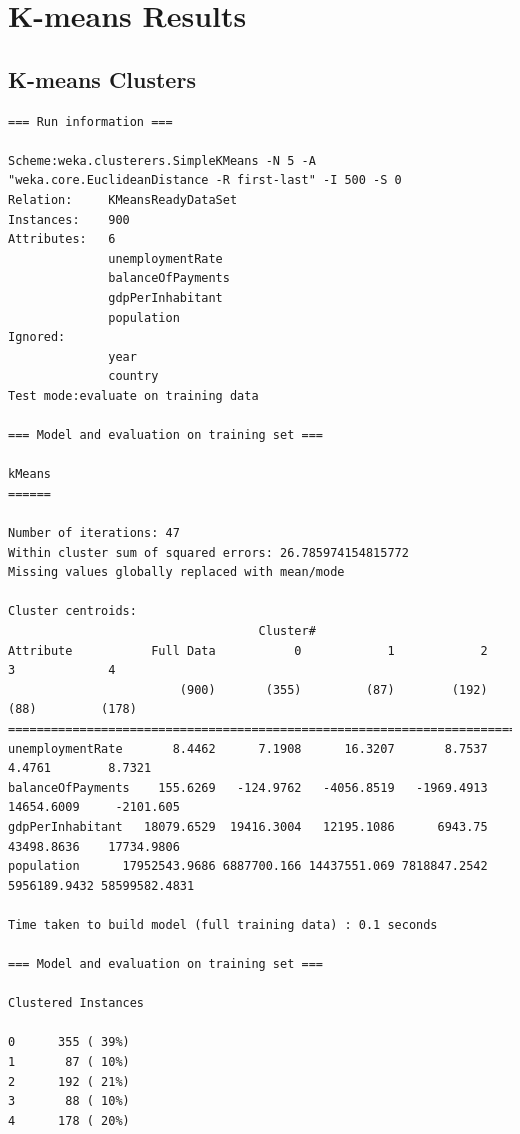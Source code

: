 \section{K-means Results}

\subsection{K-means Clusters}
\label{A_kmr_clusters}
\begin{lstlisting}[basicstyle=\footnotesize\ttfamily,numbers=none]
=== Run information ===

Scheme:weka.clusterers.SimpleKMeans -N 5 -A "weka.core.EuclideanDistance -R first-last" -I 500 -S 0
Relation:     KMeansReadyDataSet
Instances:    900
Attributes:   6
              unemploymentRate
              balanceOfPayments
              gdpPerInhabitant
              population
Ignored:
              year
              country
Test mode:evaluate on training data

=== Model and evaluation on training set ===

kMeans
======

Number of iterations: 47
Within cluster sum of squared errors: 26.785974154815772
Missing values globally replaced with mean/mode

Cluster centroids:
                                   Cluster#
Attribute           Full Data           0            1            2            3             4
                        (900)       (355)         (87)        (192)         (88)         (178)
=================================================================================================
unemploymentRate       8.4462      7.1908      16.3207       8.7537       4.4761        8.7321
balanceOfPayments    155.6269   -124.9762   -4056.8519   -1969.4913   14654.6009     -2101.605
gdpPerInhabitant   18079.6529  19416.3004   12195.1086      6943.75   43498.8636    17734.9806
population      17952543.9686 6887700.166 14437551.069 7818847.2542 5956189.9432 58599582.4831

Time taken to build model (full training data) : 0.1 seconds

=== Model and evaluation on training set ===

Clustered Instances

0      355 ( 39%)
1       87 ( 10%)
2      192 ( 21%)
3       88 ( 10%)
4      178 ( 20%)
\end{lstlisting}

